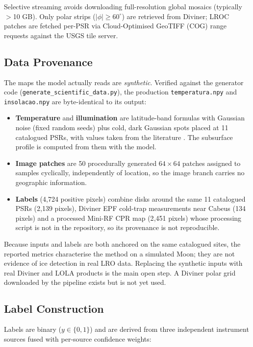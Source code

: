 \documentclass[12pt,a4paper]{article}
\begin{document}
Selective streaming avoids downloading full-resolution global mosaics
(typically $>$10 GB). Only polar strips ($|\phi| \geq 60^\circ$) are retrieved
from Diviner; LROC patches are fetched per-PSR via Cloud-Optimised GeoTIFF
(COG) range requests against the USGS tile server.

\subsection{Data Provenance}
\label{sec:provenance}

The maps the model actually reads are \emph{synthetic}. Verified against the
generator code (\texttt{generate\_scientific\_data.py}), the production
\texttt{temperatura.npy} and \texttt{insolacao.npy} are byte-identical to its
output:
\begin{itemize}
  \item \textbf{Temperature} and \textbf{illumination} are latitude-band formulas
    with Gaussian noise (fixed random seeds) plus cold, dark Gaussian spots placed
    at 11 catalogued PSRs, with values taken from the literature
    \citep{paige2010,mazarico2011}. The subsurface profile is computed from them
    with the \citet{vasavada2012} model.
  \item \textbf{Image patches} are 50 procedurally generated $64\times64$ patches
    assigned to samples cyclically, independently of location, so the image
    branch carries no geographic information.
  \item \textbf{Labels} (4{,}724 positive pixels) combine disks around the same 11
    catalogued PSRs (2{,}139 pixels), Diviner EPF cold-trap measurements near
    Cabeus (134 pixels) and a processed Mini-RF CPR map (2{,}451 pixels) whose
    processing script is not in the repository, so its provenance is not
    reproducible.
\end{itemize}
Because inputs and labels are both anchored on the same catalogued sites, the
reported metrics characterise the method on a simulated Moon; they are not
evidence of ice detection in real LRO data. Replacing the synthetic inputs with
real Diviner and LOLA products is the main open step. A Diviner polar grid
downloaded by the pipeline exists but is not yet used.

\subsection{Label Construction}

Labels are binary ($y \in \{0, 1\}$) and are derived from three independent
instrument sources fused with per-source confidence weights:
\end{document}
